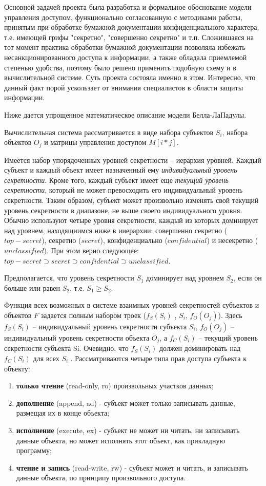 Основной задачей проекта была разработка и формальное обоснование модели управления доступом, функционально согласованную с методиками работы, принятым при обработке бумажной документации конфиденциального характера, т.е. имеющей грифы "секретно", "совершенно секретно" и т.п. Сложившаяся на тот момент практика обработки бумажной документации позволяла избежать несанкционированного доступа к информации, а также обладала приемлемой степенью удобства, поэтому было решено применить подобную схему и в вычислительной системе. Суть проекта состояла именно в этом. Интересно, что данный факт порой ускользает от внимания специалистов в области защиты информации. 

Ниже дается упрощенное математическое описание модели Белла-ЛаПадулы.

Вычислительная система рассматривается в виде набора субъектов $S_{i}$, набора объектов $O_{j}$ и матрицы управления доступом $M[i*j]$. 

Имеется набор упорядоченных уровней секретности -- иерархия уровней. Каждый субъект и каждый объект имеет назначенный ему \textit{индивидуальный уровень секретности}. Кроме того, каждый субъект имеет еще \textit{текущий уровень секретности}, который не может превосходить его индивидуальный уровень секретности. Таким образом, субъект может произвольно изменять свой текущий уровень секретности в диапазоне, не выше своего индивидуального уровня. Обычно используют четыре уровня секретности, каждый из которых доминирует над уровнем, находящиимся ниже в ииерархии: совершенно секретно ($top-secret$),  секретно ($secret$),  конфиденциально ($confidential$) и несекретно ($unclassified$).  При этом верно следующее: $ top-secret \supset secret \supset confidential \supset unclassified $. 

Предполагается, что уровень секретности $S_1$ доминирует над уровнем $S_2$, если он больше или равен $S_2$, т.е. $S_1 \geq S_2$.

Функция всех возможных в системе взаимных уровней секретностей субъектов и объектов $F$ задается полным набором троек ($f_S(S_i)$ , $S_i$, $f_O(O_j)$). Здесь $f_S(S_i)$ – индивидуальный уровень секретности субъекта $S_i$, $f_O(O_j)$ – индивидуальный уровень секретности объекта $O_j$, а $f_C(S_i)$ – текущий уровень секретности субъекта Si. Очевидно, что $f_S(S_i)$ должен доминировать над $f_C(S_i)$ для всех $S_i$ . Рассматриваются четыре типа прав доступа субъекта к объекту: 

\begin{enumerate}
	\item\textbf{только чтение} (read-only, ro) произвольных участков данных; 
	\item\textbf{дополнение} (append, ad) - субъект может только записывать данные, размещая их в конце объекта; 
	\item\textbf{исполнение} (execute, ex) - субъект не может ни читать, ни записывать данные объекта, но может исполнять этот объект, как прикладную программу; 
	\item\textbf{чтение и запись} (read-write, rw) - субъект может и читать, и записывать данные объекта, по принципу произвольного доступа. 
\end{enumerate}


